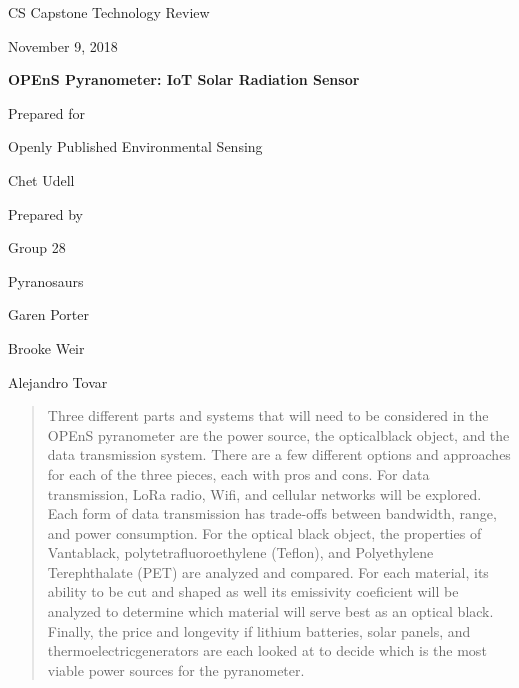 \documentclass[10pt,draftclsnofoot,onecolumn,letterpaper]{article}
\def \CapstoneTeamName{		Pyranosaurs}
\def \CapstoneTeamNumber{		28}
\def \GroupMemberOne{			Garen Porter}
\def \GroupMemberTwo{			Brooke Weir}
\def \GroupMemberThree{			Alejandro Tovar}
\def \CapstoneProjectName{		OPEnS Pyranometer: IoT Solar Radiation Sensor}
\def \CapstoneSponsorCompany{	Openly Published Environmental Sensing}
\def \CapstoneSponsorPerson{		Chet Udell}
\def \DocType{		%
				Technology Review
				}
\newcommand{\NameSigPair}[1]{\par
\makebox[2.75in][r]{#1} \hfil 	\makebox[3.25in]{\makebox[2.25in]{\hrulefill} \hfill		\makebox[.75in]{\hrulefill}}
\par\vspace{-12pt} \textit{\tiny\noindent
\makebox[2.75in]{} \hfil		\makebox[3.25in]{\makebox[2.25in][r]{Signature} \hfill	\makebox[.75in][r]{Date}}}}
\renewcommand{\NameSigPair}[1]{#1}
\begin{document}
\begin{titlepage}
    \begin{singlespace}
        \hfill 
        \par\vspace{.2in}
        \centering
        \scshape{
            \huge CS Capstone \DocType \par
            {\large November 9, 2018}\par
            \vspace{.5in}
            \textbf{\Huge\CapstoneProjectName}\par
            \vfill
            {\large Prepared for}\par
            \Huge \CapstoneSponsorCompany\par
            \vspace{5pt}
            {\Large\NameSigPair{\CapstoneSponsorPerson}\par}
            {\large Prepared by }\par
            Group\CapstoneTeamNumber\par
            \CapstoneTeamName\par 
            \vspace{5pt}
            {\Large
                \NameSigPair{\GroupMemberOne}\par
                \NameSigPair{\GroupMemberTwo}\par
                \NameSigPair{\GroupMemberThree}\par
            }
            \vspace{20pt}
        }
        \begin{abstract}
Three different parts and systems that will need to be considered in the OPEnS pyranometer are the power source, the opticalblack object, and the data transmission system. There are a few different options and approaches for each of the three pieces, each with pros and cons. For data transmission, LoRa radio, Wifi, and cellular networks will be explored. Each form of data transmission has trade-offs between bandwidth, range, and power consumption. For the optical black object, the properties of Vantablack, polytetrafluoroethylene (Teflon), and Polyethylene Terephthalate (PET) are analyzed and compared. For each material, its ability to be cut and shaped as well its emissivity coeficient will be analyzed to determine which material will serve best as an optical black. Finally, the price and longevity if lithium batteries, solar panels, and thermoelectricgenerators are each looked at to decide which is the most viable power sources for the pyranometer.
        \end{abstract}     
    \end{singlespace}
\end{titlepage}
\end{document}
